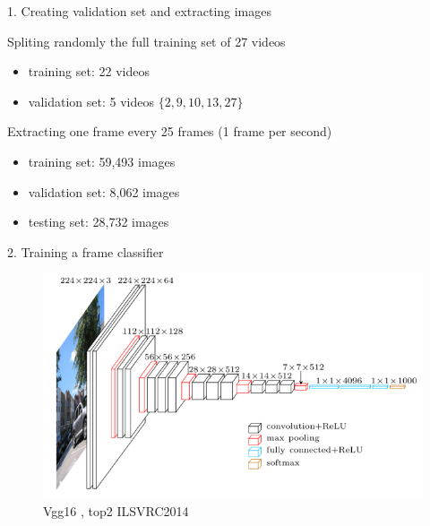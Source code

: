 \begin{frame}{1. Creating validation set and extracting images}

	Spliting randomly the full training set of 27 videos
	\begin{itemize}
		\item training set: 22 videos
		\item validation set: 5 videos $\{2,9,10,13,27\}$
	\end{itemize}
	
	\vspace{1cm}	
	
	Extracting one frame every 25 frames (1 frame per second)
	\begin{itemize}
		\item training set: 59,493 images
		\item validation set: 8,062 images
		\item testing set: 28,732 images
	\end{itemize}
	

\end{frame}

\begin{frame}{2. Training a frame classifier}

	\begin{figure}[h]
		\centering
		\includegraphics[width=.80\linewidth]{images/vgg16.png}
		\caption{\small Vgg16 \cite{simonyan2014very}, top2 ILSVRC2014}
		\label{fig:quora-invariance-1}
	\end{figure}
	
\end{frame}

